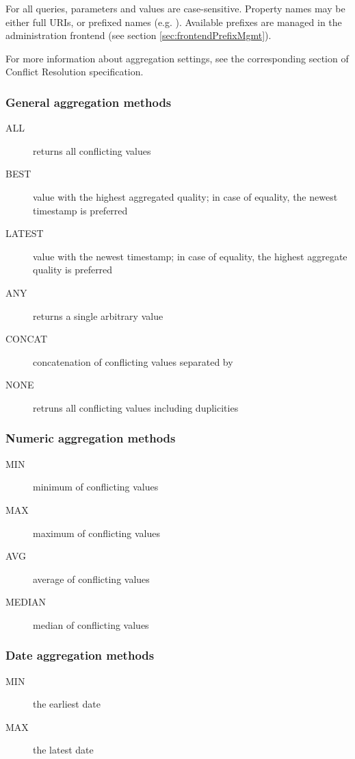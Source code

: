 For all queries, parameters and values are case-sensitive. Property names may be either full URIs, or prefixed names (e.g. ). Available prefixes are managed in the administration frontend (see section \ref{sec:frontendPrefixMgmt}).

For more information about aggregation settings, see the corresponding section of Conflict Resolution specification.

\subsubsection*{General aggregation methods}

\begin{description}
	\item[ALL]
		returns all conflicting values
	\item[BEST]
		value with the highest aggregated quality; in case of equality, the newest timestamp is preferred
	\item[LATEST]
		value with the newest timestamp; in case of equality, the highest aggregate quality is preferred
	\item[ANY]
		returns a single arbitrary value
	\item[CONCAT]
		concatenation of conflicting values separated by \quot{\code{;\ }}
	\item[NONE]
		retruns all conflicting values including duplicities
\end{description}

\subsubsection*{Numeric aggregation methods}

\begin{description}
	\item[MIN]
		minimum of conflicting values
	\item[MAX]
		maximum of conflicting values
	\item[AVG]
		average of conflicting values
	\item[MEDIAN]
		median of conflicting values
\end{description}

\subsubsection*{Date aggregation methods}

\begin{description}
	\item[MIN]
		the earliest date
	\item[MAX]
		the latest date
\end{description}

